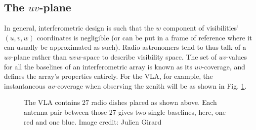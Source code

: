 \subsection{The $uv$-plane}

\pg
In general, interferometric design is such that the $w$ component of visibilities' $(u,v,w)$ coordinates is negligible (or can be put in a frame of reference where it can usually be approximated as such). Radio astronomers tend to thus talk of a $uv$-plane rather than $uvw$-space to describe visibility space. The set of $uv$-values for all the baselines of an interferometric array is known as its $uv$-coverage, and defines the array's properties entirely.
For the VLA, for example, the instantaneous $uv$-coverage when observing the zenith will be as shown in Fig. \ref{fig.vla.uvcoverage}.

\begin{figure}[ht]
\centering
{}
\caption{\label{fig.vla.uvcoverage} The VLA contains 27 radio dishes placed as shown above. Each antenna pair between those 27 gives two single baselines, here, one red and one blue. Image credit: Julien Girard}
\end{figure}


